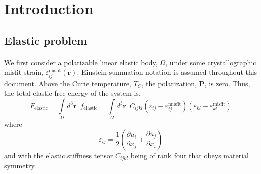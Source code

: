 \documentclass[22pt]{article} %
\begin{document}
%
%
%


\tableofcontents %

\newpage %

\large

\section{Introduction}

\subsection{Elastic problem}

%
\paragraph{}We first consider a polarizable linear elastic body, $\Omega$, under some crystallographic misfit strain, $\varepsilon_{ij}^\mathrm{misfit} (\textbf{r})$.
%
Einstein summation notation is assumed throughout this document.
%
Above the Curie temperature, $T_C$, the polarization, $\textbf{P}$, is zero. 
%
Thus, the total elastic free energy of the system is, 
%
\begin{equation}\tag{1}
F_\mathrm{elastic} = \int\limits_\Omega d^3 \textbf{r} \,\,\, f_\mathrm{elastic} = \int\limits_\Omega d^3 \textbf{r} \,\,\, C_{ijkl} \left(\varepsilon_{ij} - \varepsilon_{ij}^\mathrm{misfit} \right) \left(\varepsilon_{kl} - \varepsilon_{kl}^\mathrm{misfit} \right) 
\end{equation}
%
where 
%
\begin{equation}\tag{2}
\varepsilon_{ij} = \frac{1}{2} \left(\frac{\partial u_i}{\partial x_j} + \frac{\partial u_j}{\partial x_i} \right)
\end{equation}
%
and with the elastic stiffness tensor $C_{ijkl}$ being of rank four that obeys material symmetry \cite{NyeBook}.
%
\end{document}
